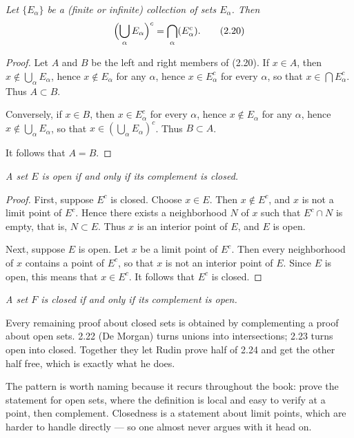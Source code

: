 \emph{Let $\{E_\alpha\}$ be a (finite or infinite) collection of sets
$E_\alpha$. Then}
\begin{equation}
  \Bigl(\bigcup_\alpha E_\alpha\Bigr)^c = \bigcap_\alpha (E_\alpha^c). \tag{2.20}
\end{equation}

\begin{proof}
Let $A$ and $B$ be the left and right members of (2.20). If $x \in A$, then
$x \notin \bigcup_\alpha E_\alpha$, hence $x \notin E_\alpha$ for any $\alpha$,
hence $x \in E_\alpha^c$ for every $\alpha$, so that $x \in \bigcap
E_\alpha^c$. Thus $A \subset B$.

Conversely, if $x \in B$, then $x \in E_\alpha^c$ for every $\alpha$, hence
$x \notin E_\alpha$ for any $\alpha$, hence $x \notin \bigcup_\alpha E_\alpha$,
so that $x \in (\bigcup_\alpha E_\alpha)^c$. Thus $B \subset A$.

It follows that $A = B$.
\end{proof}

\emph{A set $E$ is open if and only if its complement is closed.}

\begin{proof}
First, suppose $E^c$ is closed. Choose $x \in E$. Then $x \notin E^c$, and $x$
is not a limit point of $E^c$. Hence there exists a neighborhood $N$ of $x$
such that $E^c \cap N$ is empty, that is, $N \subset E$. Thus $x$ is an
interior point of $E$, and $E$ is open.

Next, suppose $E$ is open. Let $x$ be a limit point of $E^c$. Then every
neighborhood of $x$ contains a point of $E^c$, so that $x$ is not an interior
point of $E$. Since $E$ is open, this means that $x \in E^c$. It follows that
$E^c$ is closed.
\end{proof}

\emph{A set $F$ is closed if and only if its complement is open.}

\begin{deeper}
Every remaining proof about closed sets is obtained by complementing a proof
about open sets. 2.22 (De Morgan) turns unions into intersections; 2.23 turns
open into closed. Together they let Rudin prove half of 2.24 and get the other
half free, which is exactly what he does.

The pattern is worth naming because it recurs throughout the book: prove the
statement for open sets, where the definition is local and easy to verify at a
point, then complement. Closedness is a statement about limit points, which are
harder to handle directly --- so one almost never argues with it head on.
\end{deeper}

